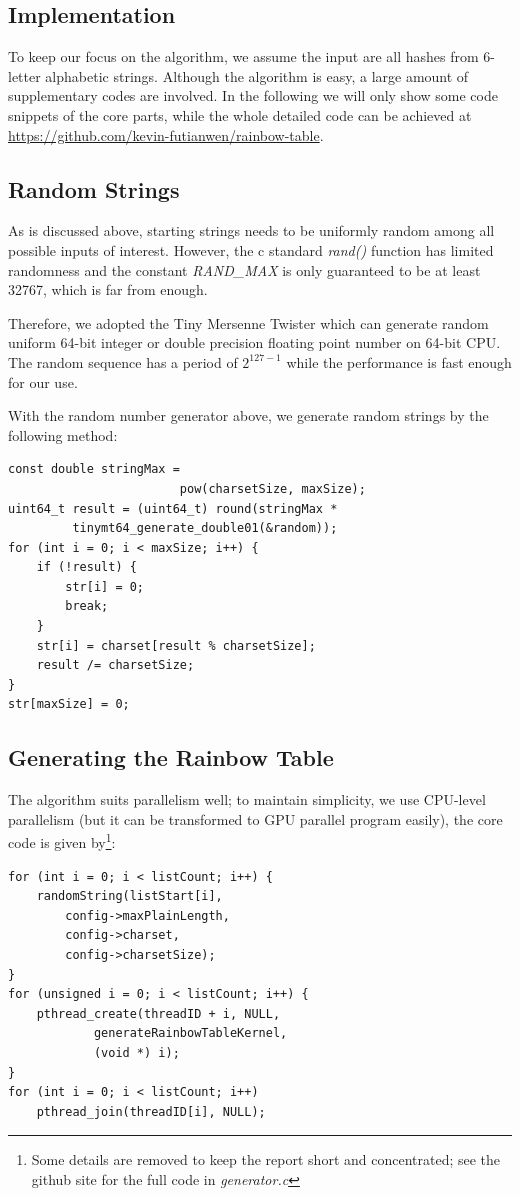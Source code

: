 \documentclass{article}
\begin{document}
\begin{multicols}{2}
\section{Implementation}
To keep our focus on the algorithm, we assume the input are all hashes from 6-letter alphabetic strings. Although the algorithm is easy, a large amount of supplementary codes are involved. In the following we will only show some code snippets of the core parts, while the whole detailed code can be achieved at \url{https://github.com/kevin-futianwen/rainbow-table}. 

\subsection{Random Strings}
As is discussed above, starting strings needs to be uniformly random among all possible inputs of interest. However, the c standard \textit{rand()} function has limited randomness and the constant \textit{RAND\_MAX} is only guaranteed to be at least 32767, which is far from enough.

Therefore, we adopted the Tiny Mersenne Twister\cite{tinymt} which can generate random uniform 64-bit integer or double precision floating point number on 64-bit CPU. The random sequence has a period of $2^{127-1}$ while the performance is fast enough for our use.

With the random number generator above, we generate random strings by the following method: 

\begin{verbatim}
const double stringMax = 
						pow(charsetSize, maxSize);
uint64_t result = (uint64_t) round(stringMax *
		 tinymt64_generate_double01(&random));
for (int i = 0; i < maxSize; i++) {
	if (!result) {
		str[i] = 0;
		break;
	}
	str[i] = charset[result % charsetSize];
	result /= charsetSize;
}
str[maxSize] = 0;
\end{verbatim}
\subsection{Generating the Rainbow Table}
The algorithm suits parallelism well; to maintain simplicity, we use CPU-level parallelism (but it can be transformed to GPU parallel program easily), the core code is given by\footnote{Some details are removed to keep the report short and concentrated; see the github site for the full code in \textit{generator.c}}:

\begin{verbatim}
for (int i = 0; i < listCount; i++) {
	randomString(listStart[i],
		config->maxPlainLength, 
		config->charset, 
		config->charsetSize);
}
for (unsigned i = 0; i < listCount; i++) {
	pthread_create(threadID + i, NULL, 
			generateRainbowTableKernel, 
			(void *) i); 
}
for (int i = 0; i < listCount; i++)
	pthread_join(threadID[i], NULL); 
\end{verbatim}


\end{multicols}
\end{document}
